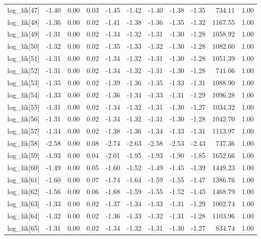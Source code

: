 \begin{table}[ht]
\begin{tabular}{rrrrrrrrrrr}
  log\_lik[47] & -1.40 & 0.00 & 0.03 & -1.45 & -1.42 & -1.40 & -1.38 & -1.35 & 734.11 & 1.00 \\ 
  log\_lik[48] & -1.36 & 0.00 & 0.02 & -1.41 & -1.38 & -1.36 & -1.35 & -1.32 & 1167.55 & 1.00 \\ 
  log\_lik[49] & -1.31 & 0.00 & 0.02 & -1.34 & -1.32 & -1.31 & -1.30 & -1.28 & 1058.92 & 1.00 \\ 
  log\_lik[50] & -1.32 & 0.00 & 0.02 & -1.35 & -1.33 & -1.32 & -1.30 & -1.28 & 1082.60 & 1.00 \\ 
  log\_lik[51] & -1.31 & 0.00 & 0.02 & -1.34 & -1.32 & -1.31 & -1.30 & -1.28 & 1051.39 & 1.00 \\ 
  log\_lik[52] & -1.31 & 0.00 & 0.02 & -1.34 & -1.32 & -1.31 & -1.30 & -1.28 & 741.06 & 1.00 \\ 
  log\_lik[53] & -1.35 & 0.00 & 0.02 & -1.39 & -1.36 & -1.35 & -1.33 & -1.31 & 1088.90 & 1.00 \\ 
  log\_lik[54] & -1.33 & 0.00 & 0.02 & -1.36 & -1.34 & -1.33 & -1.31 & -1.29 & 1096.28 & 1.00 \\ 
  log\_lik[55] & -1.31 & 0.00 & 0.02 & -1.34 & -1.32 & -1.31 & -1.30 & -1.27 & 1034.32 & 1.00 \\ 
  log\_lik[56] & -1.31 & 0.00 & 0.02 & -1.34 & -1.32 & -1.31 & -1.30 & -1.28 & 1042.70 & 1.00 \\ 
  log\_lik[57] & -1.34 & 0.00 & 0.02 & -1.38 & -1.36 & -1.34 & -1.33 & -1.31 & 1113.97 & 1.00 \\ 
  log\_lik[58] & -2.58 & 0.00 & 0.08 & -2.74 & -2.63 & -2.58 & -2.53 & -2.43 & 737.36 & 1.00 \\ 
  log\_lik[59] & -1.93 & 0.00 & 0.04 & -2.01 & -1.95 & -1.93 & -1.90 & -1.85 & 1652.66 & 1.00 \\ 
  log\_lik[60] & -1.49 & 0.00 & 0.05 & -1.60 & -1.52 & -1.49 & -1.45 & -1.39 & 1449.23 & 1.00 \\ 
  log\_lik[61] & -1.60 & 0.00 & 0.07 & -1.74 & -1.64 & -1.59 & -1.55 & -1.47 & 1386.76 & 1.00 \\ 
  log\_lik[62] & -1.56 & 0.00 & 0.06 & -1.68 & -1.59 & -1.55 & -1.52 & -1.45 & 1468.79 & 1.00 \\ 
  log\_lik[63] & -1.33 & 0.00 & 0.02 & -1.37 & -1.34 & -1.33 & -1.31 & -1.29 & 1002.74 & 1.00 \\ 
  log\_lik[64] & -1.32 & 0.00 & 0.02 & -1.36 & -1.33 & -1.32 & -1.31 & -1.28 & 1103.96 & 1.00 \\ 
  log\_lik[65] & -1.31 & 0.00 & 0.02 & -1.34 & -1.32 & -1.31 & -1.30 & -1.27 & 834.74 & 1.00 \\ 

\end{tabular}
\end{table}
